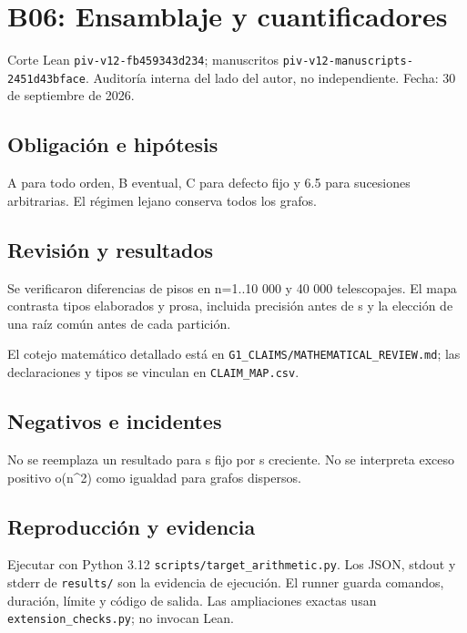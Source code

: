 \section{B06: Ensamblaje y
cuantificadores}\label{b06-ensamblaje-y-cuantificadores}

Corte Lean \texttt{piv-v12-fb459343d234}; manuscritos
\texttt{piv-v12-manuscripts-2451d43bface}. Auditoría interna del lado
del autor, no independiente. Fecha: 30 de septiembre de 2026.

\subsection{Obligación e hipótesis}\label{obligaciuxf3n-e-hipuxf3tesis}

A para todo orden, B eventual, C para defecto fijo y 6.5 para sucesiones
arbitrarias. El régimen lejano conserva todos los grafos.

\subsection{Revisión y resultados}\label{revisiuxf3n-y-resultados}

Se verificaron diferencias de pisos en n=1..10 000 y 40 000
telescopajes. El mapa contrasta tipos elaborados y prosa, incluida
precisión antes de s y la elección de una raíz común antes de cada
partición.

El cotejo matemático detallado está en
\texttt{G1\_CLAIMS/MATHEMATICAL\_REVIEW.md}; las declaraciones y tipos
se vinculan en \texttt{CLAIM\_MAP.csv}.

\subsection{Negativos e incidentes}\label{negativos-e-incidentes}

No se reemplaza un resultado para s fijo por s creciente. No se
interpreta exceso positivo o(n\^{}2) como igualdad para grafos
dispersos.

\subsection{Reproducción y evidencia}\label{reproducciuxf3n-y-evidencia}

Ejecutar con Python 3.12 \texttt{scripts/target\_arithmetic.py}. Los
JSON, stdout y stderr de \texttt{results/} son la evidencia de
ejecución. El runner guarda comandos, duración, límite y código de
salida. Las ampliaciones exactas usan \texttt{extension\_checks.py}; no
invocan Lean.

